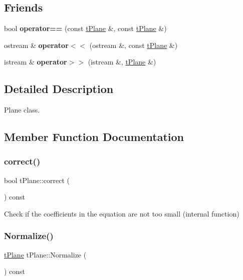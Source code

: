 \subsection*{Friends}
\begin{DoxyCompactItemize}
\item 
\mbox{\label{classtPlane_a6451041e9d6964bdee537cfbbb12b661}} 
bool {\bfseries operator==} (const \hyperlink{classtPlane}{t\+Plane} \&, const \hyperlink{classtPlane}{t\+Plane} \&)
\item 
\mbox{\label{classtPlane_a17e0e9cf17cafb43cdcd42e043267101}} 
ostream \& {\bfseries operator$<$$<$} (ostream \&, const \hyperlink{classtPlane}{t\+Plane} \&)
\item 
\mbox{\label{classtPlane_aee7595b1119f9dea39ba0c12dc8c4dc3}} 
istream \& {\bfseries operator$>$$>$} (istream \&, \hyperlink{classtPlane}{t\+Plane} \&)
\end{DoxyCompactItemize}


\subsection{Detailed Description}
Plane class. 

\subsection{Member Function Documentation}
\mbox{\label{classtPlane_a382974c179a2bac3eb2da1d18c4dd860}} 
\subsubsection{\texorpdfstring{correct()}{correct()}}
{\footnotesize\ttfamily bool t\+Plane\+::correct (\begin{DoxyParamCaption}{ }\end{DoxyParamCaption}) const}

Check if the coefficients in the equation are not too small (internal function) \mbox{\label{classtPlane_a8957e329f01270932a9a5b73ee9fe33a}} 
\subsubsection{\texorpdfstring{Normalize()}{Normalize()}}
{\footnotesize\ttfamily \hyperlink{classtPlane}{t\+Plane} t\+Plane\+::\+Normalize (\begin{DoxyParamCaption}{ }\end{DoxyParamCaption}) const}

